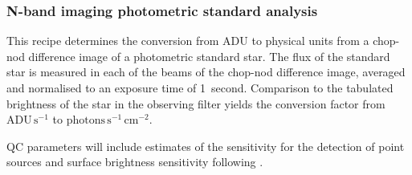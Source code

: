 
\clearpage
\subsubsection{N-band imaging photometric standard analysis}
\label{n_img_std_process}
\label{rec:n_img_std_process}
\label{ssec:n_img_std_process}
\label{sssec:n_img_std_process}
\label{metis_n_img_std_process}
\label{rec:metis_n_img_std_process}
\label{sssec:metis_n_img_std_process}

This recipe determines the conversion from ADU to physical units from
a chop-nod difference image of a photometric standard star.  The flux
of the standard star is measured in each of the beams of the chop-nod
difference image, averaged and normalised to an exposure time of
1~second. Comparison to the tabulated brightness of the star in the
observing filter yields the conversion factor from
$\mathrm{ADU}\,\mathrm{s}^{-1}$ to
$\mathrm{photons}\,\mathrm{s}^{-1}\,\mathrm{cm}^{-2}$.

QC parameters will include estimates of the sensitivity for the
detection of point sources and surface brightness sensitivity
following \cite{visir_manual}.

